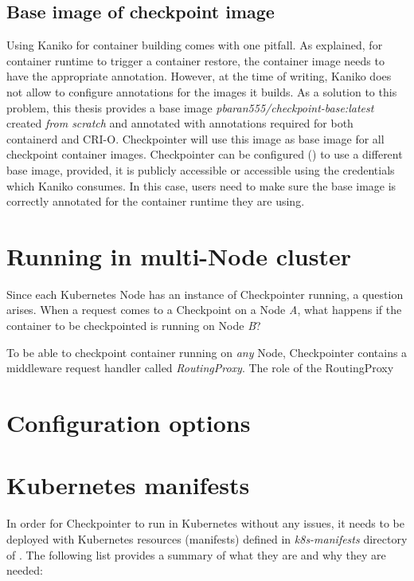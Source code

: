 \documentclass[
  digital,     %
  oneside,     %
  nosansbold,  %
  nocolorbold, %
  lof,         %
  lot,         %
]{fithesis4}
\begin{document}
\subsection{Base image of checkpoint image}
Using Kaniko for container building comes with one pitfall. As  explained, for container runtime to trigger a container restore, the container image needs to have the appropriate annotation. However, at the time of writing, Kaniko does not allow to configure annotations for the images it builds. As a solution to this problem, this thesis provides a base image \emph{pbaran555/checkpoint-base:latest} created \emph{from scratch} and annotated with annotations required for both containerd and CRI-O. Checkpointer will use this image as base image for all checkpoint container images. Checkpointer can be configured () to use a different base image, provided, it is publicly accessible or accessible using the credentials which Kaniko consumes. In this case, users need to make sure the base image is correctly annotated for the container runtime they are using.



\section{Running in multi-Node cluster}
Since each Kubernetes Node has an instance of Checkpointer running, a question arises. When a request comes to a Checkpoint on a Node \emph{A}, what happens if the container to be checkpointed is running on Node \emph{B}?

To be able to checkpoint container running on \emph{any} Node, Checkpointer contains a middleware request handler called \emph{RoutingProxy}. The role of the RoutingProxy


\section{Configuration options}
\label{sec:checkpointer:configuration}

\section{Kubernetes manifests}
\label{sec:manifests}
In order for Checkpointer to run in Kubernetes without any issues, it needs to be deployed with Kubernetes resources (manifests) defined in \emph{k8s-manifests} directory of . The following list provides a summary of what they are and why they are needed:
\end{document}
